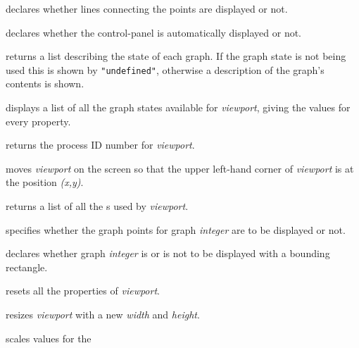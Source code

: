 \begin{description}
declares whether lines
connecting the points are displayed or not.
%
\item[\spadfun{controlPanel}]
declares
whether the \twodim{} control-panel is automatically displayed
or not.
%
\item[\spadfun{graphs}]
returns a list
describing the state of each graph.
If the graph state is not being used this is shown by {\tt "undefined"},
otherwise a description of the graph's contents is shown.
%
\item[\spadfun{graphStates}]
displays
a list of all the graph states available for {\it viewport}, giving the
values for every property.
%
\item[\spadfun{key}]
returns the process
ID number for {\it viewport}.
%
\item[\spadfun{move}]
moves {\it viewport} on the screen so that the
upper left-hand corner of {\it viewport} is at the position {\it (x,y)}.
%
\item[\spadfun{options}]
returns a list
of all the s used by {\it viewport}.
%
\item[\spadfun{points}]
specifies whether the graph points for graph {\it integer} are
to be displayed or not.
%
\item[\spadfun{region}]
declares whether graph {\it integer} is or is not to be displayed
with a bounding rectangle.
%
\item[\spadfun{reset}]
resets all the properties of {\it viewport}.
%
\item[\spadfun{resize}]
resizes {\it viewport} with a new {\it width} and {\it height}.
%
\item[\spadfun{scale}]
scales values for the

\end{description}
